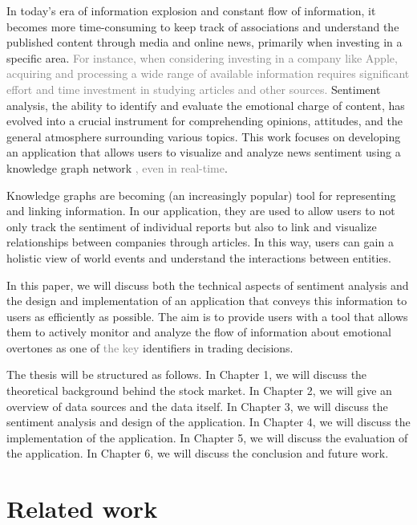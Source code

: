 

In today's era of information explosion and constant flow of information, it becomes more time-consuming to keep track of associations and understand the published content through media and online news, primarily when investing in a specific area. \textcolor{gray}{For instance, when considering investing in a company like Apple, acquiring and processing a wide range of available information requires significant effort and time investment in studying articles and other sources.} Sentiment analysis, the ability to identify and evaluate the emotional charge of content, has evolved into a crucial instrument for comprehending opinions, attitudes, and the general atmosphere surrounding various topics. This work focuses on developing an application that allows users to visualize and analyze news sentiment using a knowledge graph network \textcolor{gray}{, even in real-time}.

Knowledge graphs are becoming (an increasingly popular) tool for representing and linking information. In our application, they are used to allow users to not only track the sentiment of individual reports but also to link and visualize relationships between companies through articles. In this way, users can gain a holistic view of world events and understand the interactions between entities.

In this paper, we will discuss both the technical aspects of sentiment analysis and the design and implementation of an application that conveys this information to users as efficiently as possible. The aim is to provide users with a tool that allows them to actively monitor and analyze the flow of information about emotional overtones as one of \textcolor{gray}{the key} identifiers in trading decisions.

The thesis will be structured as follows. In Chapter 1, we will discuss the theoretical background behind the stock market. In Chapter 2, we will give an overview of data sources and the data itself. In Chapter 3, we will discuss the sentiment analysis and design of the application. In Chapter 4, we will discuss the implementation of the application. In Chapter 5, we will discuss the evaluation of the application. In Chapter 6, we will discuss the conclusion and future work.
\section*{Related work}

